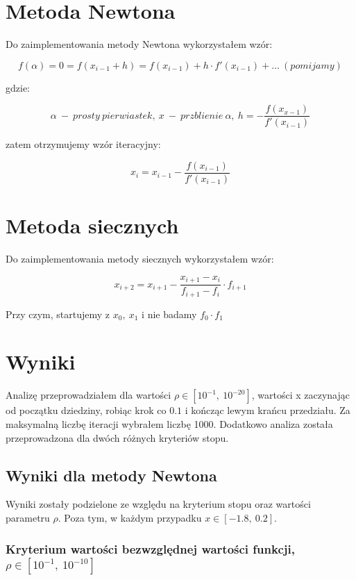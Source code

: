 \documentclass{article}
\begin{document}
\section{Metoda Newtona}

Do zaimplementowania metody Newtona wykorzystałem wzór:

\[f(\alpha) = 0 = f(x_{i - 1} + h) = f(x_{i - 1}) + h \cdot f'(x_{i - 1}) + ... \ (pomijamy)\]

\noindent
gdzie:

\[\alpha \  - \  prosty \ pierwiastek, \ x \ - \ przblienie \ \alpha, \ h = -\frac{f(x_{x - 1})}{f'(x_{i - 1})}\]

\noindent
zatem otrzymujemy wzór iteracyjny:

\[x_i =x_{i - 1} - \frac{f(x_{i - 1})}{f'(x_{i - 1})}\] 

\section{Metoda siecznych}

Do zaimplementowania metody siecznych wykorzystałem wzór:

\[x_{i + 2} = x_{i + 1} - \frac{x_{i + 1} - x_i}{f_{i + 1} - f_i} \cdot f_{i + 1}\]

\bigbreak

\noindent
Przy czym, startujemy z \(x_0, \ x_1\) i nie badamy \(f_0 \cdot f_1\)

\newpage

\section{Wyniki}

Analizę przeprowadziałem dla wartości \(\rho \in [10^{-1},\ 10^{-20}]\), wartości x zaczynając od początku dziedziny, robiąc krok co \(0.1\) i kończąc lewym krańcu przedziału. Za maksymalną liczbę iteracji wybrałem liczbę 1000. Dodatkowo analiza została przeprowadzona dla dwóch różnych kryteriów stopu.

\subsection{Wyniki dla metody Newtona}

 Wyniki zostały podzielone ze względu na kryterium stopu oraz wartości parametru \(\rho\). Poza tym, w każdym przypadku \(x \in [-1.8, \ 0.2]\).

\subsubsection{Kryterium wartości bezwzględnej wartości funkcji, \(\rho \in [10^{-1}, \ 10^{-10}]\)}
\end{document}

